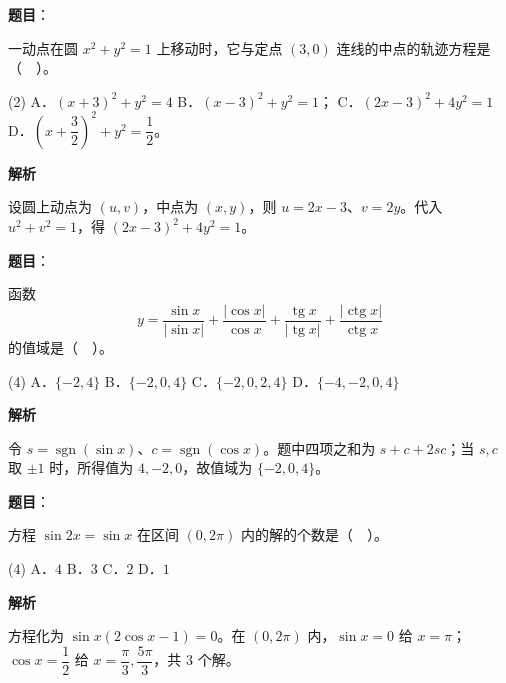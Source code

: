 \begin{answer}

\textbf{题目}：

一动点在圆 $x^2+y^2=1$ 上移动时，它与定点 $(3,0)$ 连线的中点的轨迹方程是（　）。

\begin{gkopts}(2)
\task A．$(x+3)^2+y^2=4$
\task B．$(x-3)^2+y^2=1$；
\task C．$(2x-3)^2+4y^2=1$
\task D．$\left(x+\dfrac32\right)^2+y^2=\dfrac12$。
\end{gkopts}

\textbf{解析}

设圆上动点为 $(u,v)$，中点为 $(x,y)$，则 $u=2x-3$、$v=2y$。代入 $u^2+v^2=1$，得 $(2x-3)^2+4y^2=1$。


\end{answer}
\begin{answer}

\textbf{题目}：

函数
\nopagebreak[4]
\[
y=\frac{\sin x}{|\sin x|}+\frac{|\cos x|}{\cos x}+\frac{\operatorname{tg}x}{|\operatorname{tg}x|}+\frac{|\operatorname{ctg}x|}{\operatorname{ctg}x}
\]
的值域是（　）。

\begin{gkopts}(4)
\task A．$\{-2,4\}$
\task B．$\{-2,0,4\}$
\task C．$\{-2,0,2,4\}$
\task D．$\{-4,-2,0,4\}$
\end{gkopts}

\textbf{解析}

令 $s=\operatorname{sgn}(\sin x)$、$c=\operatorname{sgn}(\cos x)$。题中四项之和为 $s+c+2sc$；当 $s,c$ 取 $\pm1$ 时，所得值为 $4,-2,0$，故值域为 $\{-2,0,4\}$。


\end{answer}
\begin{answer}

\textbf{题目}：

方程 $\sin 2x=\sin x$ 在区间 $(0,2\pi)$ 内的解的个数是（　）。

\begin{gkopts}(4)
\task A．$4$
\task B．$3$
\task C．$2$
\task D．$1$
\end{gkopts}

\textbf{解析}

方程化为 $\sin x(2\cos x-1)=0$。在 $(0,2\pi)$ 内，$\sin x=0$ 给 $x=\pi$；$\cos x=\dfrac12$ 给 $x=\dfrac\pi3,\dfrac{5\pi}3$，共 $3$ 个解。


\end{answer}
